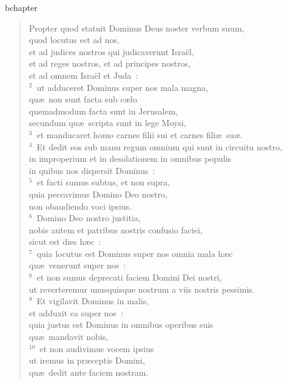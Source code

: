 bchapter\begin{flushleft}\begin{verse}\vspace{-19pt}Propter quod statuit Dominus Deus noster verbum suum,\\ quod locutus est ad nos,\\ et ad judices nostros qui judicaverunt Isra\"el,\\ et ad reges nostros, et ad principes nostros,\\ et ad omnem Isra\"el et Juda~:\\
${}^{2}$~ut adduceret Dominus super nos mala magna,\\ qu\ae\ non sunt facta sub c\ae lo\\ quemadmodum facta sunt in Jerusalem,\\ secundum qu\ae\ scripta sunt in lege Moysi,\\
${}^{3}$~et manducaret homo carnes filii sui et carnes fili\ae\ su\ae .\\
${}^{4}$~Et dedit eos sub manu regum omnium qui sunt in circuitu nostro,\\ in improperium et in desolationem in omnibus populis\\ in quibus nos dispersit Dominus~:\\
${}^{5}$~et facti sumus subtus, et non supra,\\ quia peccavimus Domino Deo nostro,\\ non obaudiendo voci ipsius.\\
${}^{6}$~Domino Deo nostro justitia,\\ nobis autem et patribus nostris confusio faciei,\\ sicut est dies h\ae c~:\\
${}^{7}$~quia locutus est Dominus super nos omnia mala h\ae c\\ qu\ae\ venerunt super nos~:\\
${}^{8}$~et non sumus deprecati faciem Domini Dei nostri,\\ ut reverteremur unusquisque nostrum a viis nostris pessimis.\\
${}^{9}$~Et vigilavit Dominus in malis,\\ et adduxit ea super nos~:\\ quia justus est Dominus in omnibus operibus suis\\ qu\ae\ mandavit nobis,\\
${}^{10}$~et non audivimus vocem ipsius\\ ut iremus in pr\ae ceptis Domini,\\ qu\ae\ dedit ante faciem nostram.\end{verse}\end{flushleft}


